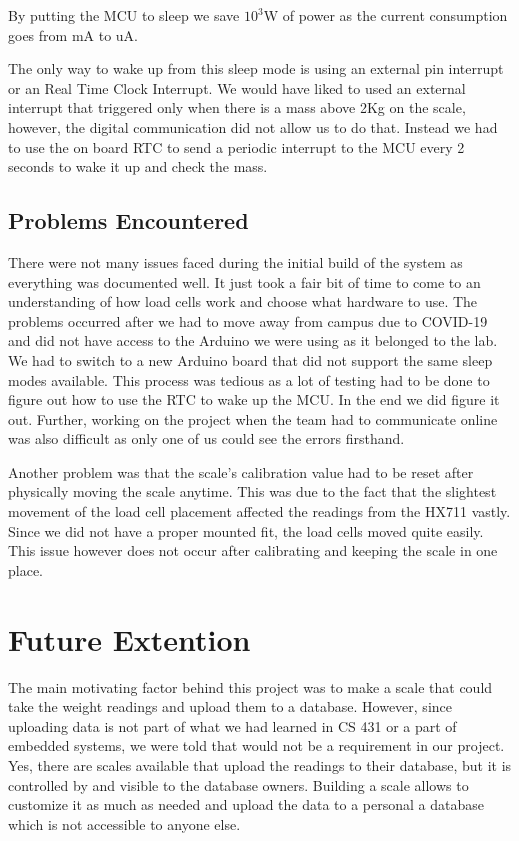 \documentclass[letterpaper,11pt]{article}
\begin{document}
By putting the MCU to sleep we save $10^3$W of power as the
current consumption goes from mA to uA.

The only way to wake up from this sleep mode is using an external pin interrupt
or an Real Time Clock Interrupt. We would have liked to used an external
interrupt that triggered only when there is a mass above 2Kg on the scale,
however, the digital communication did not allow us to do that. Instead we had
to use the on board RTC to send a periodic interrupt to the MCU every 2 seconds
to wake it up and check the mass.

\subsection{Problems Encountered}

There were not many issues faced during the initial build of the system as
everything was documented well. It just took a fair bit of time to come to an
understanding of how load cells work and choose what hardware to use. The
problems occurred after we had to move away from campus due to COVID-19 and did
not have access to the Arduino we were using as it belonged to the lab. We had
to switch to a new Arduino board that did not support the same sleep modes
available. This process was tedious as a lot of testing had to be done to figure
out how to use the RTC to wake up the MCU. In the end we did figure it
out. Further, working on the project when the team had to communicate online was
also difficult as only one of us could see the errors firsthand.

Another problem was that the scale's calibration value had to be reset after
physically moving the scale anytime. This was due to the fact that the slightest
movement of the load cell placement affected the readings from the HX711
vastly. Since we did not have a proper mounted fit, the load cells moved quite
easily. This issue however does not occur after calibrating and keeping the
scale in one place.

\section{Future Extention}
The main motivating factor behind this project was to make a scale that could
take the weight readings and upload them to a database. However, since uploading
data is not part of what we had learned in CS 431 or a part of embedded systems,
we were told that would not be a requirement in our project. Yes, there are
scales available that upload the readings to their database, but it is
controlled by and visible to the database owners. Building a scale allows to
customize it as much as needed and upload the data to a personal a database
which is not accessible to anyone else.
\end{document}
